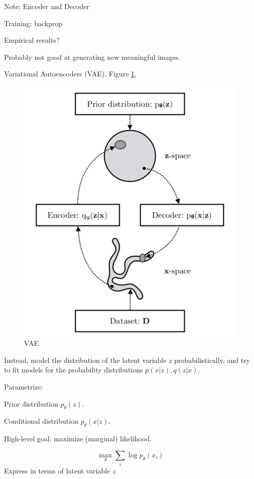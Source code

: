 \documentclass[english]{article}
\begin{document}
Note: Encoder and Decoder

Training: backprop

Empirical results?

Probably not good at generating new meaningful images.

\item Variational Autoencoders  (VAE). Figure \ref{vae},

\begin{figure}
  \centering
  \includegraphics[scale=0.6]{vae.png}
    \caption{VAE}
    \label{vae}
\end{figure}

Instead, model the distribution of the latent variable $z$ probabilistically, and try to fit models for the probability distributions $p(x|z), q(z|x)$.

Parametrize:
\benum 
\item  Prior distribution $p_\theta(z)$.
\item  Conditional distribution $p_\theta(x|z)$.
\eenum 

High-level goal: maximize (marginal) likelihood. 

$$\max_\theta \sum_i \log p_\theta(x_i) 
$$
Express in terms of latent variable $z$
\end{document}
